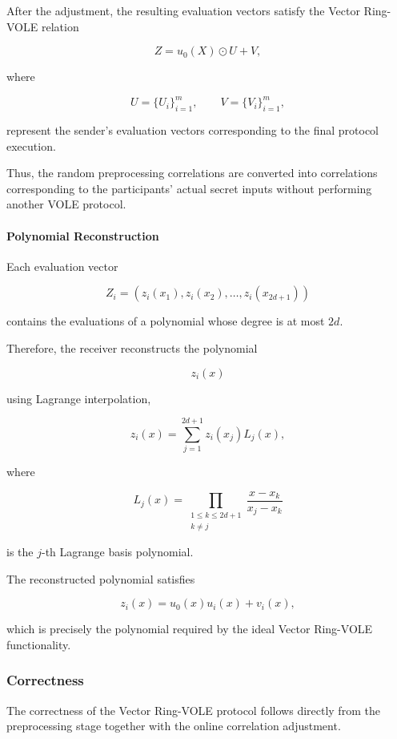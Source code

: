 \documentclass[11pt,a4paper]{article}
\begin{document}
After the adjustment, the resulting evaluation vectors satisfy the Vector Ring-VOLE relation

\[
Z
=
u_0(X)\odot U
+
V,
\]

where

\[
U
=
\{U_i\}_{i=1}^{m},
\qquad
V
=
\{V_i\}_{i=1}^{m},
\]

represent the sender's evaluation vectors corresponding to the final protocol execution.

Thus, the random preprocessing correlations are converted into correlations corresponding to the
participants' actual secret inputs without performing another VOLE protocol.

 

\paragraph{Polynomial Reconstruction}

Each evaluation vector

\[
Z_i
=
\left(
z_i(x_1),
z_i(x_2),
\ldots,
z_i(x_{2d+1})
\right)
\]

contains the evaluations of a polynomial whose degree is at most $2d$.

Therefore, the receiver reconstructs the polynomial

\[
z_i(x)
\]

using Lagrange interpolation,

\[
z_i(x)
=
\sum_{j=1}^{2d+1}
z_i(x_j)L_j(x),
\]

where

\[
L_j(x)
=
\prod_{\substack{1\le k\le2d+1\\k\neq j}}
\frac{x-x_k}{x_j-x_k}
\]

is the $j$-th Lagrange basis polynomial.

The reconstructed polynomial satisfies

\[
z_i(x)
=
u_0(x)u_i(x)
+
v_i(x),
\]

which is precisely the polynomial required by the ideal Vector Ring-VOLE functionality.

 

\subsubsection{Correctness}

The correctness of the Vector Ring-VOLE protocol follows directly from the preprocessing stage together
with the online correlation adjustment.
\end{document}
